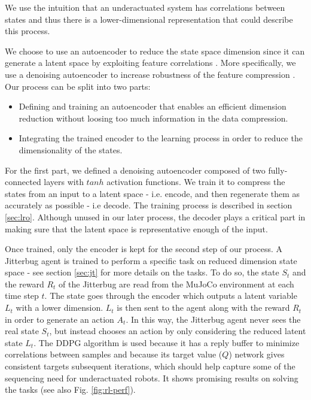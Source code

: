 \documentclass{article}
\begin{document}
We use the intuition that an underactuated system has correlations between states and thus there is a lower-dimensional representation that could describe this process. 

We choose to use an autoencoder to reduce the state space dimension since it can generate a latent space by exploiting feature correlations \cite{AE_hinton2006reducing}.
More specifically, we use a denoising autoencoder to increase robustness of the feature compression \cite{vincent2008extracting}.
Our process can be split into two parts:

\begin{itemize}
    \item Defining and training an autoencoder that enables an efficient dimension reduction without loosing too much information in the data compression. 
    \item Integrating the trained encoder to the learning process in order to reduce the dimensionality of the states.
\end{itemize}

For the first part, we defined a denoising autoencoder composed of two fully-connected layers with $tanh$ activation functions. We train it to compress the states from an input to a latent space - i.e. encode, and then regenerate them as accurately as possible - i.e decode.
The training process is described in section \ref{sec:lro}.
Although unused in our later process, the decoder plays a critical part in making sure that the latent space is representative enough of the input.

Once trained, only the encoder is kept for the second step of our process. A Jitterbug agent is trained to perform a specific task on reduced dimension state space - see section \ref{sec:jt} for more details on the tasks.
To do so, the state $S_t$ and the reward $R_t$  of the Jitterbug are read from the MuJoCo environment \cite{Todorov2012MuJoCo} at each time step $t$.
The state goes through the encoder which outputs a latent variable $L_t$ with a lower dimension. $L_t$ is then sent to the agent along with the reward $R_t$ in order to generate an action $A_t$.
In this way, the Jitterbug agent never sees the real state $S_t$, but instead chooses an action by only considering the reduced latent state $L_t$.
The  DDPG algorithm is used because it has a reply buffer to minimize correlations between samples and because its target value ($Q$) network gives consistent targets subsequent iterations, which should help capture some of the sequencing need for underactuated robots.
It shows promising results on solving the tasks (see also Fig. \ref{fig:rl-perf}).
\end{document}
